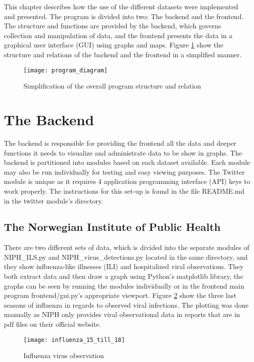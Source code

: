 This chapter describes how the use of the different datasets were implemented and presented. The program is divided into two: The backend and the frontend. The structure and functions are provided by the backend, which governs collection and manipulation of data, and the frontend presents the data in a graphical user interface (GUI) using graphs and maps. Figure \ref{fig:program} show the structure and relations of the backend and the frontend in a simplified manner.

\begin{figure}[h]
\texttt{[image: program\_diagram]}
\centering
\caption{Simplification of the overall program structure and relation}
\label{fig:program}
\end{figure}

\section{The Backend}
The backend is responsible for providing the frontend all the data and deeper functions it needs to visualize and administrate data to be show in graphs. The backend is partitioned into modules based on each dataset available. Each module may also be run individually for testing and easy viewing purposes. The Twitter module is unique as it requires 4 application programming interface (API) keys to work properly. The instructions for this set-up is found in the file README.md in the twitter module's directory.




\subsection{The Norwegian Institute of Public Health}
There are two different sets of data, which is divided into the separate modules of NIPH\_ILS.py and NIPH\_virus\_detections.py located in the same directory, and they show influenza-like illnesses (ILI) and hospitalized viral observations. They both extract data and then draw a graph using Python's matplotlib library, the graphs can be seen by running the modules individually or in the frontend main program frontend/gui.py's appropriate viewport. Figure \ref{fig:infstat} show the three last seasons of influenza in regards to observed viral infections. The plotting was done manually as NIPH only provides viral observational data in reports that are in pdf files on their official website\cite{fhi}.

\begin{figure}[h]
\texttt{[image: influenza\_15\_till\_18]}
\centering
\caption{Influenza virus observation}
\label{fig:infstat}
\end{figure}

